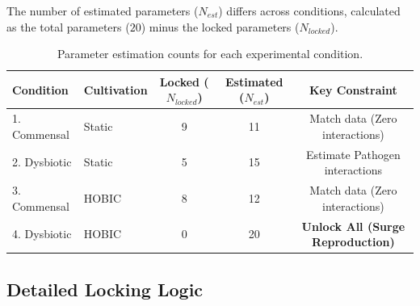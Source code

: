 \documentclass[11pt,a4paper]{article}
\begin{document}
The number of estimated parameters ($N_{est}$) differs across conditions, calculated as the total parameters ($20$) minus the locked parameters ($N_{locked}$).

\begin{table}[h]
\centering
\small
\begin{tabular}{llccc}
\toprule
\textbf{Condition} & \textbf{Cultivation} & \textbf{Locked ($N_{locked}$)} & \textbf{Estimated ($N_{est}$)} & \textbf{Key Constraint} \\
\midrule
1. Commensal & Static & 9 & 11 & Match data (Zero interactions) \\
2. Dysbiotic & Static & 5 & 15 & Estimate Pathogen interactions \\
3. Commensal & HOBIC & 8 & 12 & Match data (Zero interactions) \\
4. Dysbiotic & HOBIC & 0 & 20 & \textbf{Unlock All (Surge Reproduction)} \\
\bottomrule
\end{tabular}
\caption{Parameter estimation counts for each experimental condition.}
\label{tab:conditions}
\end{table}

\subsection{Detailed Locking Logic}
\end{document}
